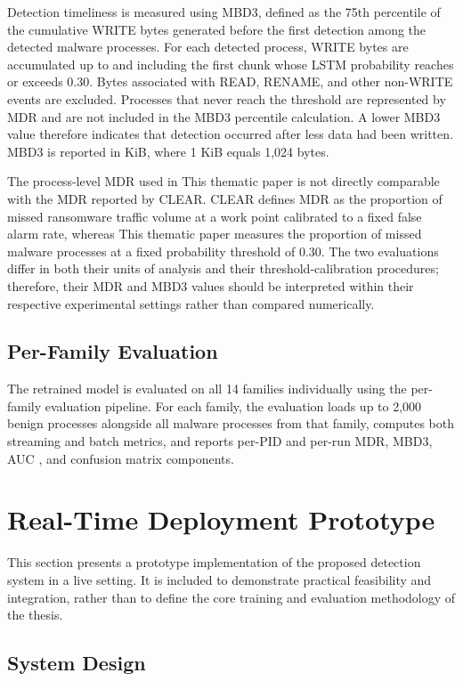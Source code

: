 Detection timeliness is measured using MBD3, defined as the 75th percentile of the cumulative WRITE bytes generated before the first detection among the detected malware processes. For each detected process, WRITE bytes are accumulated up to and including the first chunk whose \textmu{}LSTM probability reaches or exceeds 0.30. Bytes associated with READ, RENAME, and other non-WRITE events are excluded. Processes that never reach the threshold are represented by MDR and are not included in the MBD3 percentile calculation. A lower MBD3 value therefore indicates that detection occurred after less data had been written. MBD3 is reported in KiB, where 1 KiB equals 1,024 bytes.

The process-level MDR used in This thematic paper is not directly comparable with the MDR reported by CLEAR. CLEAR defines MDR as the proportion of missed ransomware traffic volume at a work point calibrated to a fixed false alarm rate, whereas This thematic paper measures the proportion of missed malware processes at a fixed probability threshold of 0.30. The two evaluations differ in both their units of analysis and their threshold-calibration procedures; therefore, their MDR and MBD3 values should be interpreted within their respective experimental settings rather than compared numerically.

\subsection{Per-Family Evaluation}\label{sec:3.7.2}

The retrained model is evaluated on all 14 families individually using the per-family evaluation pipeline. For each family, the evaluation loads up to 2,000 benign processes alongside all malware processes from that family, computes both streaming and batch metrics, and reports per-PID and per-run MDR, MBD3, AUC \cite{ref48}, and confusion matrix components.

\section{Real-Time Deployment Prototype}\label{sec:3.8}

This section presents a prototype implementation of the proposed detection system in a live setting. It is included to demonstrate practical feasibility and integration, rather than to define the core training and evaluation methodology of the thesis.

\subsection{System Design}\label{sec:3.8.1}

